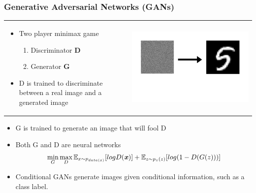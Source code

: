 \documentclass{beamer}
\begin{document}
\begin{frame}
\frametitle{\textbf{Generative Adversarial Networks (GANs)}}

\begin{tabular}{ll}
\begin{minipage}{0.5\textwidth}
    \begin{itemize}
        \item Two player minimax game
	     \begin{enumerate}[$-$]
           \item Discriminator \textbf{D}
           \item Generator \textbf{G}
           \end{enumerate}
       \item D is trained to discriminate between a real image and a generated image
         \end{itemize}
\end{minipage}
&
\begin{minipage}{0.5\textwidth}
\includegraphics[width=0.9 \linewidth]{9.pdf}\end{minipage}
\end{tabular}


\begin{itemize}
\addtolength{\itemindent}{2.5mm}
  \item G is trained to generate an image that will fool D
  \item Both G and D are neural networks
      \[\min\limits_{G}\max\limits_{D} \mathbb{E}_{x \sim p_{data(x)}} [logD(\textbf{\textit{x}})] + \mathbb{E}_{z \sim p_z(z)}[log(1 - D(G(z)))]\]
  \item Conditional GANs generate images given conditional information, such as a class label.
\end{itemize}

\end{frame}
\end{document}
